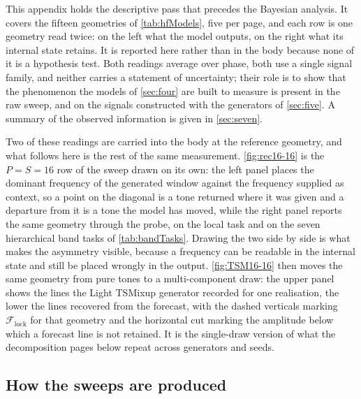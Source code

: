 This appendix holds the descriptive pass that precedes the Bayesian analysis. It covers the fifteen geometries of \autoref{tab:hfModels}, five per page, and each row is one geometry read twice: on the left what the model outputs, on the right what its internal state retains. It is reported here rather than in the body because none of it is a hypothesis test. Both readings average over phase, both use a single signal family, and neither carries a statement of uncertainty; their role is to show that the phenomenon the models of \autoref{sec:four} are built to measure is present in the raw sweep, and on the signals constructed with the generators of \autoref{sec:five}. A summary of the observed information is given in \autoref{sec:seven}.

Two of these readings are carried into the body at the reference geometry, and what follows here is the rest of the same measurement. \autoref{fig:rec16-16} is the $P=S=16$ row of the sweep drawn on its own: the left panel places the dominant frequency of the generated window against the frequency supplied as context, so a point on the diagonal is a tone returned where it was given and a departure from it is a tone the model has moved, while the right panel reports the same geometry through the probe, on the local task and on the seven hierarchical band tasks of \autoref{tab:bandTasks}. Drawing the two side by side is what makes the asymmetry visible, because a frequency can be readable in the internal state and still be placed wrongly in the output. \autoref{fig:TSM16-16} then moves the same geometry from pure tones to a multi-component draw: the upper panel shows the lines the Light TSMixup generator recorded for one realisation, the lower the lines recovered from the forecast, with the dashed verticals marking $\mathcal F_{\mathrm{lock}}$ for that geometry and the horizontal cut marking the amplitude below which a forecast line is not retained. It is the single-draw version of what the decomposition pages below repeat across generators and seeds.

\subsection{How the sweeps are produced}

